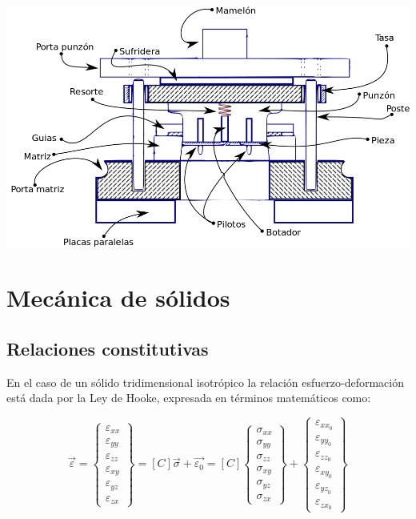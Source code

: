 \begin{center}
\includegraphics[scale=0.3]{src/ch2/componentes_troquel.png}
\label{fig:componentes_troquel}
\end{center}


\section{Mecánica de sólidos}

\subsection{Relaciones constitutivas}

En el caso de un sólido tridimensional isotrópico la relación esfuerzo-deformación está dada por la Ley de Hooke, 
expresada en términos matemáticos como:

\begin{equation}\label{eq:ecdef}
\vec{\varepsilon} = 
\left\{\begin{matrix}
\varepsilon_{xx} \\ \varepsilon_{yy} \\ \varepsilon_{zz} \\ \varepsilon_{xy} \\ \varepsilon_{yz} \\ \varepsilon_{zx}
\end{matrix}\right\} = 
\left[ C \right] \vec{\sigma} + \vec{\varepsilon_0} = 
\left[ C \right]
\left\{\begin{matrix}
\sigma_{xx} \\ \sigma_{yy} \\ \sigma_{zz} \\ \sigma_{xy} \\ \sigma_{yz} \\ \sigma_{zx}
\end{matrix}\right\} + 
\left\{\begin{matrix}
\varepsilon_{xx}_0 \\ \varepsilon_{yy}_0 \\ \varepsilon_{zz}_0 \\ \varepsilon_{xy}_0 \\ \varepsilon_{yz}_0 \\ \varepsilon_{zx}_0
\end{matrix}\right\}
\end{equation}

